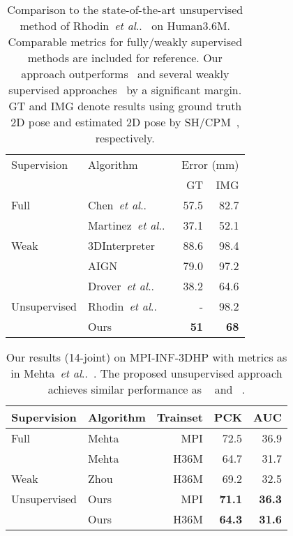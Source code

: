 \documentclass[10pt,twocolumn,letterpaper]{article}
\makeatletter
\DeclareRobustCommand\onedot{\futurelet\@let@token\@onedot}
\def\@onedot{\ifx\@let@token.\else.\null\fi\xspace}
\def\etal{\emph{et al}\onedot}
\makeatother
\begin{document}
\begin{table}[htb!]
\centering
\begin{tabularx}{\linewidth}{lXrr}\toprule
	Supervision & Algorithm & \multicolumn{2}{c}{Error (mm)} \\
	 &  & GT & IMG\\
	\midrule \midrule
	Full & Chen~\etal~\cite{ChenDeva2017}  & 57.5 & 82.7 \\
    & Martinez~\etal~\cite{MartinezICCV2017} & 37.1 & 52.1\\
\midrule
Weak & 3DInterpreter~\cite{InterpreterNetwork2016} & 88.6 & 98.4\\
& AIGN~\cite{Tung_2017_ICCV}  & 79.0 & 97.2\\
& Drover~\etal~\cite{ZedNet_2018_ECCVW} & 38.2 & 64.6 \\
\midrule
	Unsupervised & Rhodin~\etal~\cite{Rhodin_2018_ECCV} & - & 98.2 \\
	&Ours & \textbf{51} & \textbf{68}\\
	\bottomrule
\end{tabularx}
\caption{Comparison to the state-of-the-art unsupervised method of Rhodin~\etal~\cite{Rhodin_2018_ECCV} on Human3.6M. Comparable metrics for fully/weakly supervised methods are included for reference. Our approach outperforms~\cite{Rhodin_2018_ECCV} and several weakly supervised approaches~\cite{Tung_2017_ICCV,InterpreterNetwork2016} by a significant margin. GT and IMG denote results using ground truth 2D pose and estimated 2D pose by SH/CPM~\cite{stacked-hourglass,cpm}, respectively.}
\label{table:result_summary}
\end{table}

\begin{table}[htb!]
	\centering
	\begin{tabularx}{\linewidth}{lXrrr}
		\toprule
		Supervision & Algorithm &Trainset& PCK & AUC \\
		\midrule \midrule
		Full & Mehta~\cite{mono-3dhp2017} & MPI& 72.5 & 36.9\\
		& Mehta~\cite{mono-3dhp2017} & H36M& 64.7 & 31.7\\ 
       \midrule
       Weak & Zhou~\cite{zhou2017towards} &H36M & 69.2 & 32.5 \\
       \midrule
       Unsupervised & Ours & MPI& \textbf{71.1} & \textbf{36.3}\\
       & Ours & H36M& \textbf{64.3} & \textbf{31.6}\\
       \bottomrule
    \end{tabularx}
\caption{Our results (14-joint) on MPI-INF-3DHP with metrics as in Mehta~\etal~\cite{mono-3dhp2017}. The proposed unsupervised approach achieves similar performance as ~\cite{mono-3dhp2017} and ~\cite{zhou2017towards}.}
\label{table:MPI}
\end{table}   
\end{document}
